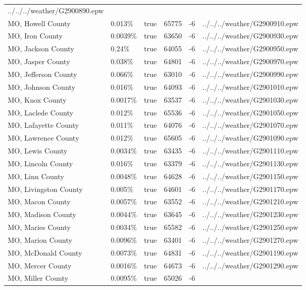 \begin{longtable}[]{@{}llllll@{}}
../../../weather/G2900890.epw \\
MO, Howell County & 0.013\% & true & 65775 & -6 &
../../../weather/G2900910.epw \\
MO, Iron County & 0.0039\% & true & 63650 & -6 &
../../../weather/G2900930.epw \\
MO, Jackson County & 0.24\% & true & 64055 & -6 &
../../../weather/G2900950.epw \\
MO, Jasper County & 0.038\% & true & 64801 & -6 &
../../../weather/G2900970.epw \\
MO, Jefferson County & 0.066\% & true & 63010 & -6 &
../../../weather/G2900990.epw \\
MO, Johnson County & 0.016\% & true & 64093 & -6 &
../../../weather/G2901010.epw \\
MO, Knox County & 0.0017\% & true & 63537 & -6 &
../../../weather/G2901030.epw \\
MO, Laclede County & 0.012\% & true & 65536 & -6 &
../../../weather/G2901050.epw \\
MO, Lafayette County & 0.011\% & true & 64076 & -6 &
../../../weather/G2901070.epw \\
MO, Lawrence County & 0.012\% & true & 65605 & -6 &
../../../weather/G2901090.epw \\
MO, Lewis County & 0.0034\% & true & 63435 & -6 &
../../../weather/G2901110.epw \\
MO, Lincoln County & 0.016\% & true & 63379 & -6 &
../../../weather/G2901130.epw \\
MO, Linn County & 0.0048\% & true & 64628 & -6 &
../../../weather/G2901150.epw \\
MO, Livingston County & 0.005\% & true & 64601 & -6 &
../../../weather/G2901170.epw \\
MO, Macon County & 0.0057\% & true & 63552 & -6 &
../../../weather/G2901210.epw \\
MO, Madison County & 0.0044\% & true & 63645 & -6 &
../../../weather/G2901230.epw \\
MO, Maries County & 0.0034\% & true & 65582 & -6 &
../../../weather/G2901250.epw \\
MO, Marion County & 0.0096\% & true & 63401 & -6 &
../../../weather/G2901270.epw \\
MO, McDonald County & 0.0073\% & true & 64831 & -6 &
../../../weather/G2901190.epw \\
MO, Mercer County & 0.0016\% & true & 64673 & -6 &
../../../weather/G2901290.epw \\
MO, Miller County & 0.0095\% & true & 65026 & -6 &

\end{longtable}

